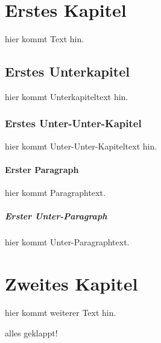 \documentclass[11pt]{article}
\begin{document}
\section{Erstes Kapitel}
hier kommt Text hin.

\subsection{Erstes Unterkapitel}
hier kommt Unterkapiteltext hin.

\subsubsection{Erstes Unter-Unter-Kapitel}
hier kommt Unter-Unter-Kapiteltext hin.

\paragraph{Erster Paragraph}
hier kommt Paragraphtext.

\subparagraph{Erster Unter-Paragraph}
hier kommt Unter-Paragraphtext.

\section{Zweites Kapitel}
hier kommt weiterer Text hin.

alles geklappt!
\end{document}
